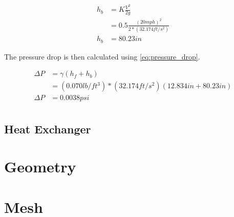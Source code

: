 \documentclass{article}
\begin{document}
\begin{equation}
	\begin{aligned}
		h_b & = K \frac{V^2}{2g}                         \\
		    & = 0.5 \frac{(20 mph)^2}{2*(32.174 ft/s^2)} \\
		h_b & = 80.23 in
	\end{aligned}
	\label{eq:head_loss-bend}
\end{equation}

The pressure drop is then calculated using \autoref{eq:pressure_drop}.

\begin{equation}
	\begin{aligned}
		\Delta P & = \gamma (h_f + h_b)                                    \\
		         & = (0.070 lb/ft^3)*(32.174 ft/s^2)(12.834 in + 80.23 in) \\
		\Delta P & = 0.0038 psi                                            \\
	\end{aligned}
	\label{eq:pressure_drop}
\end{equation}



\subsection{Heat Exchanger}




\section{Geometry}



\section{Mesh}
\end{document}
